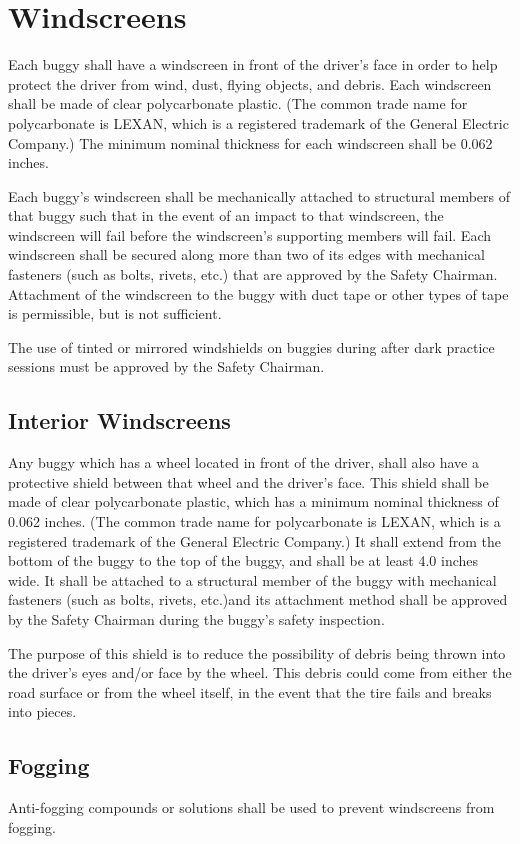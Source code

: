 \section{Windscreens}

Each buggy shall have a windscreen in front of the driver's face in order to help protect the driver from wind, dust, flying objects, and debris. Each windscreen shall be made of clear polycarbonate plastic. (The common trade name for polycarbonate is LEXAN, which is a registered trademark of the General Electric Company.) The minimum nominal thickness for each windscreen shall be 0.062 inches.

Each buggy's windscreen shall be mechanically attached to structural members of that buggy such that in the event of an impact to that windscreen, the windscreen will fail before the windscreen's supporting members will fail. Each windscreen shall be secured along more than two of its edges with mechanical fasteners (such as bolts, rivets, etc.) that are approved by the Safety Chairman. Attachment of the windscreen to the buggy with duct tape or other types of tape is permissible, but is not sufficient.

The use of tinted or mirrored windshields on buggies during after dark practice sessions must be approved by the Safety Chairman.

\subsection{Interior Windscreens}

Any buggy which has a wheel located in front of the driver, shall also have a protective shield between that wheel and the driver's face. This shield shall be made of clear polycarbonate plastic, which has a minimum nominal thickness of 0.062 inches. (The common trade name for polycarbonate is LEXAN, which is a registered trademark of the General Electric Company.) It shall extend from the bottom of the buggy to the top of the buggy, and shall be at least 4.0 inches wide. It shall be attached to a structural member of the buggy with mechanical fasteners (such as bolts, rivets, etc.)and its attachment method shall be approved by the Safety Chairman during the buggy's safety inspection.

The purpose of this shield is to reduce the possibility of debris being thrown into the driver's eyes and/or face by the wheel. This debris could come from either the road surface or from the wheel itself, in the event that the tire fails and breaks into pieces.

\subsection{Fogging}

Anti-fogging compounds or solutions shall be used to prevent windscreens from fogging.


